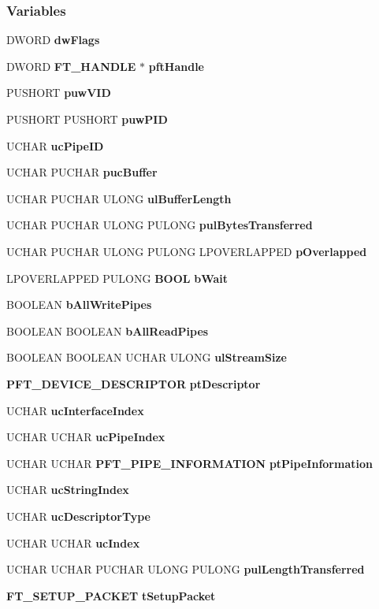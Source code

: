 \subsubsection*{Variables}
\begin{DoxyCompactItemize}
\item 
D\+W\+O\+RD {\bf dw\+Flags}
\item 
D\+W\+O\+RD {\bf F\+T\+\_\+\+H\+A\+N\+D\+LE} $\ast$ {\bf pft\+Handle}
\item 
P\+U\+S\+H\+O\+RT {\bf puw\+V\+ID}
\item 
P\+U\+S\+H\+O\+RT P\+U\+S\+H\+O\+RT {\bf puw\+P\+ID}
\item 
U\+C\+H\+AR {\bf uc\+Pipe\+ID}
\item 
U\+C\+H\+AR P\+U\+C\+H\+AR {\bf puc\+Buffer}
\item 
U\+C\+H\+AR P\+U\+C\+H\+AR U\+L\+O\+NG {\bf ul\+Buffer\+Length}
\item 
U\+C\+H\+AR P\+U\+C\+H\+AR U\+L\+O\+NG P\+U\+L\+O\+NG {\bf pul\+Bytes\+Transferred}
\item 
U\+C\+H\+AR P\+U\+C\+H\+AR U\+L\+O\+NG P\+U\+L\+O\+NG L\+P\+O\+V\+E\+R\+L\+A\+P\+P\+ED {\bf p\+Overlapped}
\item 
L\+P\+O\+V\+E\+R\+L\+A\+P\+P\+ED P\+U\+L\+O\+NG {\bf B\+O\+OL} {\bf b\+Wait}
\item 
B\+O\+O\+L\+E\+AN {\bf b\+All\+Write\+Pipes}
\item 
B\+O\+O\+L\+E\+AN B\+O\+O\+L\+E\+AN {\bf b\+All\+Read\+Pipes}
\item 
B\+O\+O\+L\+E\+AN B\+O\+O\+L\+E\+AN U\+C\+H\+AR U\+L\+O\+NG {\bf ul\+Stream\+Size}
\item 
{\bf P\+F\+T\+\_\+\+D\+E\+V\+I\+C\+E\+\_\+\+D\+E\+S\+C\+R\+I\+P\+T\+OR} {\bf pt\+Descriptor}
\item 
U\+C\+H\+AR {\bf uc\+Interface\+Index}
\item 
U\+C\+H\+AR U\+C\+H\+AR {\bf uc\+Pipe\+Index}
\item 
U\+C\+H\+AR U\+C\+H\+AR {\bf P\+F\+T\+\_\+\+P\+I\+P\+E\+\_\+\+I\+N\+F\+O\+R\+M\+A\+T\+I\+ON} {\bf pt\+Pipe\+Information}
\item 
U\+C\+H\+AR {\bf uc\+String\+Index}
\item 
U\+C\+H\+AR {\bf uc\+Descriptor\+Type}
\item 
U\+C\+H\+AR U\+C\+H\+AR {\bf uc\+Index}
\item 
U\+C\+H\+AR U\+C\+H\+AR P\+U\+C\+H\+AR U\+L\+O\+NG P\+U\+L\+O\+NG {\bf pul\+Length\+Transferred}
\item 
{\bf F\+T\+\_\+\+S\+E\+T\+U\+P\+\_\+\+P\+A\+C\+K\+ET} {\bf t\+Setup\+Packet}

\end{DoxyCompactItemize}
